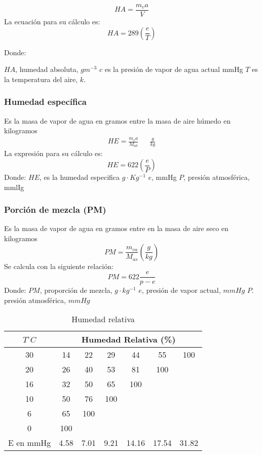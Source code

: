 \begin{equation}
    HA = \frac{m_va}{V} 
\end{equation}
La ecuación para su cálculo es:
\begin{equation}
    HA =289\left(\frac{e}{T}\right)
\end{equation}

Donde:

$HA$, humedad absoluta, $gm^{-3}$
$c$ es la presión de vapor de agua actual mmHg
$T$ es la temperatura del aire, $k$.

\subsubsection{Humedad específica}
Es la masa de vapor de agua en gramos entre la masa de aire húmedo en kilogramos
\begin{align*}
    HE =\frac{m_va}{M_{ab}} && \frac{g}{kg}
\end{align*}
La expresión para su cálculo es:
\begin{equation}
    HE=622\left(\frac{e}{P}\right)
\end{equation}
Donde:
$HE$, es la humedad especifica $g\cdot Kg^{-1}$
$e$, mmHg
$P$, presión atmosférica, mmlIg
\subsubsection{Porción de mezcla (PM)}
Es la masa de vapor de agua en gramos entre en la masa de aire seco en kilogramos
\begin{equation*}
    PM = \frac{m_{va}}{M_{as}} \left(\frac{g}{kg}\right)
\end{equation*}
Se calcula con la siguiente relación:
\begin{equation}
    PM=622 \frac{e}{p - e}
\end{equation}
Donde:
$PM$, proporción de mezcla, $g\cdot kg^{-1}$
$e$, presión de vapor actual, $mmHg$
$P$. presión atmosférica, $mmHg$
\begin{table}[h!]
\centering
    \begin{tabular}{@{}ccccccc@{}}
    \toprule
    $T^{\circ}C$ & \multicolumn{6}{c}{Humedad Relativa (\%)}  \\ \midrule
    30           & 14   & 22   & 29   & 44    & 55    & 100   \\
    20           & 26   & 40   & 53   & 81    & 100   &       \\
    16           & 32   & 50   & 65   & 100   &       &       \\
    10           & 50   & 76   & 100  &       &       &       \\
    6            & 65   & 100  &      &       &       &       \\
    0            & 100  &      &      &       &       &       \\
    E en mmHg    & 4.58 & 7.01 & 9.21 & 14.16 & 17.54 & 31.82 \\ \bottomrule
    \end{tabular}
    \caption{Humedad relativa}
    \label{tabma7}
\end{table}

